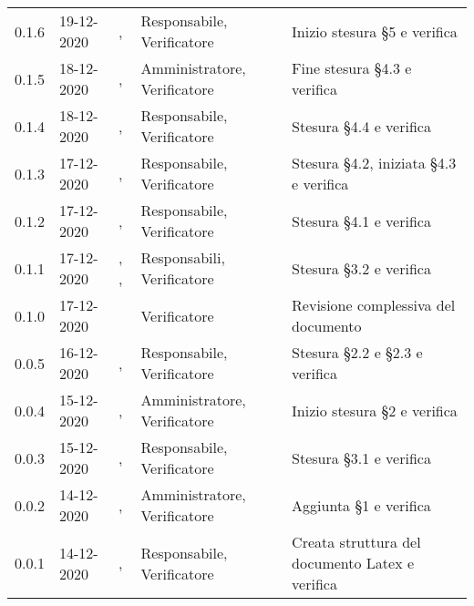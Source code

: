{{\begin{longtable}{C{1.7cm} | C{2.2cm} | C{3.2cm} | C{3cm} | C{4.8cm}}
0.1.6 & 19-12-2020 & \SG{}, \SH{} & Responsabile, Verificatore & Inizio stesura \S 5 e verifica\\

0.1.5 & 18-12-2020 & \PA{}, \SH{} & Amministratore, Verificatore & Fine stesura \S 4.3 e verifica\\

0.1.4 & 18-12-2020 & \SG{}, \ZM{} & Responsabile, Verificatore & Stesura \S 4.4 e verifica \\

0.1.3 & 17-12-2020 & \BM{}, \ZM{} & Responsabile, Verificatore & Stesura \S 4.2, iniziata \S 4.3 e verifica \\

0.1.2 & 17-12-2020 & \SG{}, \ZM{} & Responsabile, Verificatore & Stesura \S 4.1 e verifica\\

0.1.1 & 17-12-2020 & \SG{}, \BM{}, \SH{} & Responsabili, Verificatore & Stesura \S 3.2 e verifica \\

0.1.0 & 17-12-2020 & \ZM{} & Verificatore & Revisione complessiva del documento \\

0.0.5 & 16-12-2020 & \BM{}, \SH{} & Responsabile, Verificatore & Stesura \S 2.2 e \S 2.3 e verifica \\
		
0.0.4 & 15-12-2020 & \PA{}, \SH{} & Amministratore, Verificatore & Inizio stesura \S 2 e verifica \\

0.0.3 & 15-12-2020 & \SG{}, \ZM{} & Responsabile, Verificatore & Stesura \S 3.1 e verifica \\

0.0.2 & 14-12-2020 & \PA{}, \ZM{} & Amministratore, Verificatore & Aggiunta \S 1 e verifica \\

0.0.1 & 14-12-2020 & \SG{}, \ZM{} & Responsabile, Verificatore & Creata struttura del documento Latex e verifica \\
		
\end{longtable}
}
}
